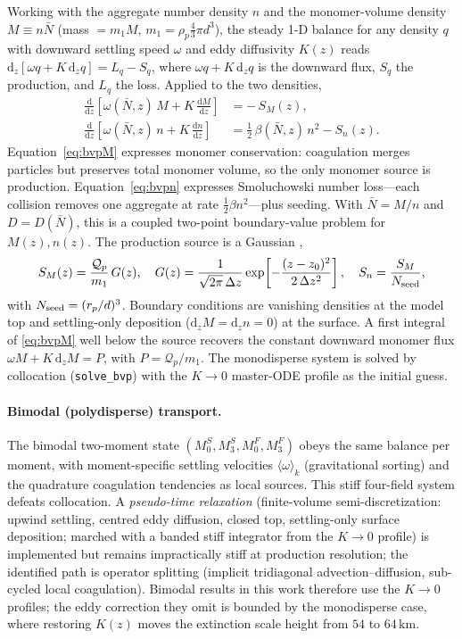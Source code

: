 \documentclass[11pt]{article}
\newcommand{\Nbar}{\bar{N}}
\newcommand{\Df}{D}
\newcommand{\dd}{\mathrm{d}}
\newcommand{\Qprod}{\mathcal{Q}_p}
\begin{document}
Working with the aggregate number density $n$ and the monomer-volume density
$M\equiv n\Nbar$ (mass $=m_1 M$, $m_1=\rho_p\tfrac{4}{3}\pi d^3$), the steady 1-D
balance for any density $q$ with downward settling speed $\omega$ and eddy
diffusivity $K(z)$ reads $\dd_z[\omega q + K\,\dd_z q]=L_q-S_q$, where
$\omega q + K\,\dd_z q$ is the downward flux, $S_q$ the production, and $L_q$ the
loss. Applied to the two densities,
\begin{align}
  \frac{\dd}{\dd z}\!\left[\omega(\Nbar,z)\,M + K\,\frac{\dd M}{\dd z}\right]
    &= -\,S_M(z),
    \label{eq:bvpM}\\
  \frac{\dd}{\dd z}\!\left[\omega(\Nbar,z)\,n + K\,\frac{\dd n}{\dd z}\right]
    &= \tfrac{1}{2}\,\beta(\Nbar,z)\,n^2 - S_n(z).
    \label{eq:bvpn}
\end{align}
Equation~\eqref{eq:bvpM} expresses monomer conservation: coagulation merges
particles but preserves total monomer volume, so the only monomer source is
production. Equation~\eqref{eq:bvpn} expresses Smoluchowski number loss---each
collision removes one aggregate at rate $\tfrac{1}{2}\beta n^2$---plus seeding.
With $\Nbar=M/n$ and $\Df=\Df(\Nbar)$, this is a coupled two-point
boundary-value problem for $M(z),n(z)$. The production source is a Gaussian
\citep[Eq.~5]{deTrenquelleon2025},
\begin{equation}
  S_M(z)=\frac{\Qprod}{m_1}\,G(z),\quad
  G(z)=\frac{1}{\sqrt{2\pi}\,\Delta z}\exp\!\left[-\frac{(z-z_0)^2}{2\,\Delta z^2}\right],
  \quad S_n=\frac{S_M}{N_{\rm seed}},
  \label{eq:source}
\end{equation}
with $N_{\rm seed}=(r_p/d)^3$. Boundary conditions are vanishing densities at the
model top and settling-only deposition ($\dd_z M=\dd_z n=0$) at the surface.
A first integral of \eqref{eq:bvpM} well below the source recovers the constant
downward monomer flux $\omega M + K\,\dd_z M = P$, with $P=\Qprod/m_1$.
The monodisperse system is solved by collocation (\texttt{solve\_bvp}) with the
$K\to0$ master-ODE profile as the initial guess.

\paragraph{Bimodal (polydisperse) transport.} The bimodal two-moment state
$(M_0^S,M_3^S,M_0^F,M_3^F)$ obeys the same balance per moment, with
moment-specific settling velocities $\langle\omega\rangle_k$ (gravitational
sorting) and the quadrature coagulation tendencies as local sources.  This
stiff four-field system defeats collocation.  A \emph{pseudo-time relaxation}
(finite-volume semi-discretization: upwind settling, centred eddy diffusion,
closed top, settling-only surface deposition; marched with a banded stiff
integrator from the $K\to0$ profile) is implemented but remains impractically
stiff at production resolution; the identified path is operator splitting
(implicit tridiagonal advection--diffusion, sub-cycled local coagulation).
Bimodal results in this work therefore use the $K\to0$ profiles; the eddy
correction they omit is bounded by the monodisperse case, where restoring
$K(z)$ moves the extinction scale height from $54$ to $64\,\mathrm{km}$.
\end{document}
